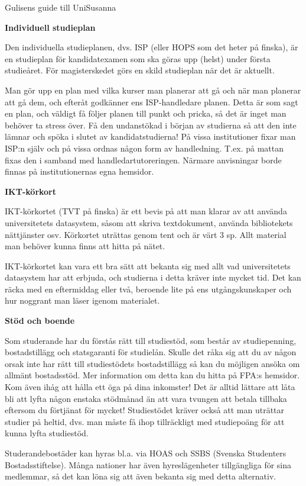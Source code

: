 \documentclass{spektraklet}
\begin{document}
\begin{artikel}{Gulisens guide till Uni}{Susanna}
\newpage

\textbf{Individuell studieplan}

Den individuella studieplanen, dvs. ISP (eller HOPS som det heter på finska), är en
studieplan för kandidatexamen som ska göras upp (helst) under första studieåret. För magisterskedet görs en skild studieplan när det är aktuellt.

Man gör upp en plan med vilka kurser man planerar att gå och när man planerar att
gå dem, och efteråt godkänner ens ISP-handledare planen. Detta är som sagt en plan,
och väldigt få följer planen till punkt och pricka, så det är inget man behöver ta stress över. Få den undanstökad i början av studierna så att den inte lämnar och spöka i slutet av kandidatstudierna! På vissa institutioner fixar man ISP:n själv och på vissa ordnas någon form av handledning. T.ex. på mattan fixas den i samband med handledartutoreringen. Närmare anvisningar borde finnas på institutionernas egna hemsidor.

\textbf{IKT-körkort}

IKT-körkortet (TVT på finska) är ett bevis på att man klarar av att använda universitetets datasystem, såsom att skriva textdokument, använda bibliotekets nättjänster osv. Körkortet uträttas genom tent och är värt 3 sp. Allt material man behöver kunna finns att hitta på nätet.

IKT-körkortet kan vara ett bra sätt att bekanta sig med allt vad universitetets datasystem har att erbjuda, och studierna i detta kräver inte mycket tid. Det kan räcka med en eftermiddag eller två, beroende lite på ens utgångskunskaper och hur noggrant man läser igenom materialet.

\textbf{Stöd och boende}

Som studerande har du förstås rätt till studiestöd, som består av studiepenning, bostadstillägg och statsgaranti för studielån. Skulle det råka sig att du av någon orsak inte har rätt till studiestödets bostadstillägg så kan du möjligen ansöka om allmänt bostadsstöd. Mer information om detta kan du hitta på FPA:s hemsidor. Kom även ihåg att hålla ett öga på dina inkomster! Det är alltid lättare att låta bli att lyfta någon enstaka stödmånad än att vara tvungen att betala tillbaka eftersom du förtjänat för mycket! Studiestödet kräver också att man uträttar studier på heltid, dvs. man måste få ihop tillräckligt med studiepoäng för att kunna lyfta studiestöd.

Studerandebostäder kan hyras bl.a. via HOAS och SSBS (Svenska Studenters Bostadsstiftelse). Många nationer har även hyreslägenheter tillgängliga för sina medlemmar, så det kan löna sig att även bekanta sig med detta alternativ.


\end{artikel}
\end{document}
